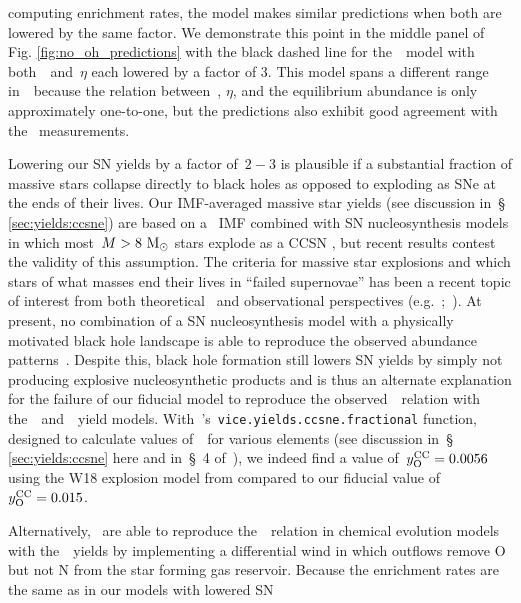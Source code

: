 \documentclass[ms.tex]{subfiles}
\begin{document}
computing enrichment rates, the model makes similar predictions when both are
lowered by the same factor.
We demonstrate this point in the middle panel of Fig.
\ref{fig:no_oh_predictions} with the black dashed line for the~\cristallo~model
with both~~and~$\eta$ each lowered by a factor of 3.
This model spans a different range in~\oh~because the relation between~,
$\eta$, and the equilibrium abundance is only approximately one-to-one, but the
predictions also exhibit good agreement with the~\citet{Dopita2016}
measurements.
\par
Lowering our SN yields by a factor of~$2 - 3$ is plausible if a substantial
fraction of massive stars collapse directly to black holes as opposed to
exploding as SNe at the ends of their lives.
Our IMF-averaged massive star yields (see discussion in~\S
\ref{sec:yields:ccsne}) are based on a~\citet{Kroupa2001} IMF combined with SN
nucleosynthesis models in which most~$M > 8~\text{M}_\odot$ stars explode as a CCSN
\cite[e.g.][]{Woosley1995, Chieffi2004, Chieffi2013, Limongi2018, Nomoto2013},
but recent results contest the validity of this assumption.
The criteria for massive star explosions and which stars of what masses end
their lives in ``failed supernovae'' has been a recent topic of interest from
both theoretical~\citep[e.g.][]{Pejcha2015, Sukhbold2016, Ertl2016} and
observational perspectives (e.g.~\citealp*{Gerke2015};~\citealp{Adams2017,
Basinger2021}).
At present, no combination of a SN nucleosynthesis model with a physically
motivated black hole landscape is able to reproduce the observed abundance
patterns~\citep{Griffith2021}.
Despite this, black hole formation still lowers SN yields by simply not
producing explosive nucleosynthetic products and is thus an alternate
explanation for the failure of our fiducial model to reproduce the
observed~\ohno~relation with the~\cristallo~and~\ventura~yield models.
With~\vice's~\texttt{vice.yields.ccsne.fractional} function, designed to
calculate values of~~for various elements (see discussion in~\S
\ref{sec:yields:ccsne} here and in~\S~4 of~\citealp{Griffith2021}), we indeed
find a value of~$y_\text{O}^\text{CC} = 0.0056$ using the W18 explosion model from
\citet{Sukhbold2016} compared to our fiducial value of~$y_\text{O}^\text{CC} = 0.015$.
\par
Alternatively,~\citet{Vincenzo2016a} are able to reproduce the~\ohno~relation
in chemical evolution models with the~\ventura~yields by implementing a
differential wind in which outflows remove O but not N from the star forming
gas reservoir.
Because the enrichment rates are the same as in our models with lowered SN
\end{document}
